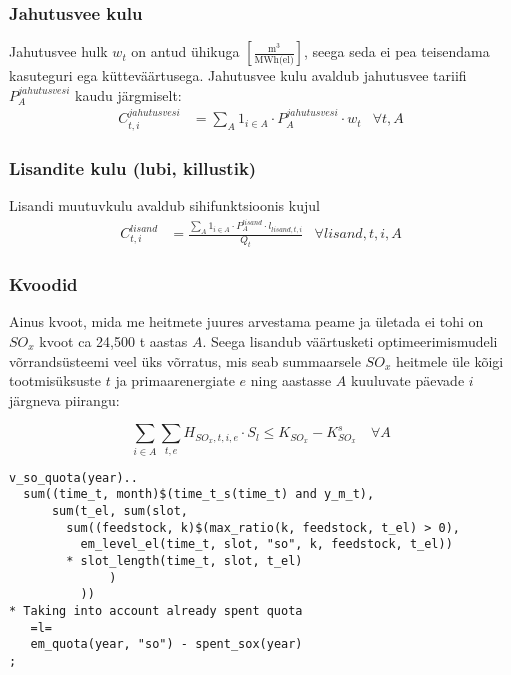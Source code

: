\documentclass[10pt,a4paper]{article}
\begin{document}
\subsubsection{Jahutusvee kulu}
Jahutusvee hulk $w_{t}$ on antud ühikuga $\left[ \frac{\text{m}^3}{\text{MWh(el)}} \right]$, seega seda ei pea teisendama kasuteguri ega kütteväärtusega. Jahutusvee kulu avaldub jahutusvee tariifi $P^{jahutusvesi}_{A}$ kaudu järgmiselt:
\begin{align}
C^{jahutusvesi}_{t, i} &= \sum_A 1_{i\in A} \cdot P^{jahutusvesi}_{A} \cdot w_{t} &\forall t,A
\end{align}

\subsubsection{Lisandite kulu (lubi, killustik)}
Lisandi muutuvkulu avaldub sihifunktsioonis kujul 
\begin{align}
C^{lisand}_{t, i} &= \frac{ \sum_A 1_{i\in A} \cdot P^{lisand}_{A} 
\cdot l_{lisand, t,i}}{Q_{t}} &\forall lisand, t, i, A
\end{align}

\subsubsection{Kvoodid}
Ainus kvoot, mida me heitmete juures arvestama peame ja ületada ei tohi on $SO_x$ kvoot ca 24,500 t aastas $A$. Seega lisandub väärtusketi optimeerimismudeli võrrandsüsteemi veel üks võrratus, mis seab summaarsele $SO_x$ heitmele üle kõigi tootmisüksuste $t$ ja primaarenergiate $e$ ning aastasse $A$ kuuluvate päevade $i$ järgneva piirangu:

\begin{equation}
\sum_{i\in A} \sum_{t, e} H_{SO_x, t, i, e}\cdot S_l \leq \mathit{K_{SO_x}} - \mathit{K^s_{SO_x}}  \quad \forall A
\end{equation}

\begin{verbatim}
v_so_quota(year)..
  sum((time_t, month)$(time_t_s(time_t) and y_m_t),
      sum(t_el, sum(slot,
        sum((feedstock, k)$(max_ratio(k, feedstock, t_el) > 0),
          em_level_el(time_t, slot, "so", k, feedstock, t_el))
        * slot_length(time_t, slot, t_el)
              )
          ))
* Taking into account already spent quota
   =l=
   em_quota(year, "so") - spent_sox(year)
;
\end{verbatim}
\end{document}
